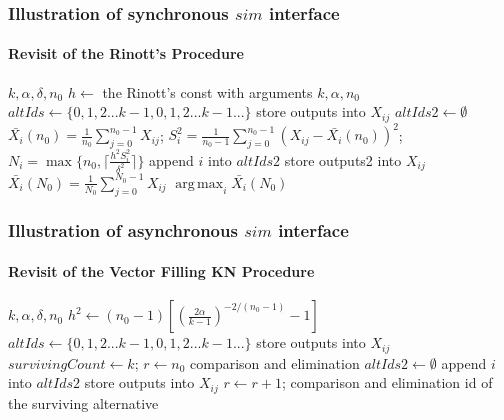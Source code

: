 \documentclass{beamer}
\DeclareMathOperator*{\argmax}{arg\,max}
\begin{document}
\begin{frame}
\frametitle{Illustration of synchronous $sim$ interface}
\framesubtitle{Revisit of the Rinott's Procedure}
\tiny
{
\begin{algorithmic}[1]
\Require $k, \alpha, \delta, n_0$
\State $h \gets$ the Rinott's const with arguments $k, \alpha, n_0$
\State $altIds \gets \{0, 1, 2...k - 1, 0, 1, 2...k - 1...\}$ 
\State store {\color{blue} outputs} into $X_{ij}$
\State $altIds2 \gets \emptyset$
  \State $\bar{X_i}(n_0) = \frac{1}{n_0} \sum_{j=0}^{n_0 - 1}X_{ij}$; 
  \State $S_i^2 = \frac{1}{n_0 - 1} \sum_{j=0}^{n_0 - 1}(X_{ij} - \bar{X_i}(n_0))^2$;
  \State $N_i = \max\{n_0, \lceil \frac{h^2S_i^2}{\delta^2} \rceil\}$
    \State append $i$ into $altIds2$
  \EndFor
\EndFor
{}
\State store {\color{blue} outputs2} into $X_{ij}$
  \State $\bar{X_i}(N_0) = \frac{1}{N_0} \sum_{j=0}^{N_0 - 1}X_{ij}$
\EndFor
\State \Return $\argmax_{i}\bar{X_i}(N_0)$
\end{algorithmic}
}
\end{frame}

\begin{frame}
\frametitle{Illustration of asynchronous $sim$ interface}
\framesubtitle{Revisit of the Vector Filling KN Procedure}
\tiny
{
\begin{algorithmic}[1]
\Require $k, \alpha, \delta, n_0$
\State $h^2 \gets (n_0 -1)[(\frac{2\alpha}{k - 1})^{-2/(n_0-1)} - 1]$
\State $altIds \gets \{0, 1, 2...k - 1, 0, 1, 2...k - 1...\}$ 
\State store outputs into $X_{ij}$
\State $survivingCount \gets k$;
\State $r \gets n_0$
\State comparison and elimination
  \State $altIds2 \gets \emptyset$
      \State append $i$ into $altIds2$
    \EndIf
  \EndFor
   
  \State store outputs into $X_{ij}$
    \State $r \gets r + 1$;
    \State comparison and elimination
  \EndIf
\EndWhile
\State \Return id of the surviving alternative
\end{algorithmic}
}
\end{frame}
\end{document}
